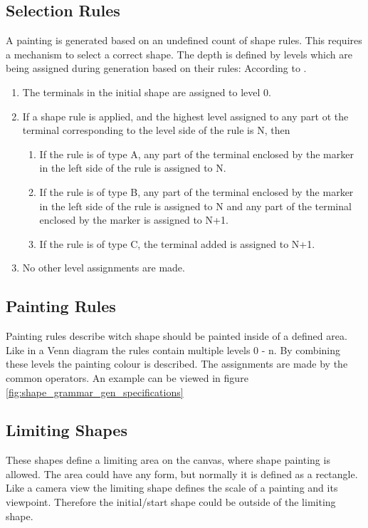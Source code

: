 \subsection{Selection Rules}
\label{sec:Shape_Grammar_Selection_Rules}
A painting is generated based on an undefined count of shape rules. This requires a mechanism to select a correct shape. The depth is defined by levels which are being assigned during generation based on their rules: According to \citep{shapeGrammars:1972}.
\begin{displayquote}
    \begin{enumerate}
        \item The terminals in the initial shape are assigned to level 0.
        \item If a shape rule is applied, and the highest level assigned to any part ot the terminal corresponding to the level side of the rule is N, then
        \begin{enumerate}
            \item If the rule is of type A, any part of the terminal enclosed by the marker in the left side of the rule is assigned to N.
            \item If the rule is of type B, any part of the terminal enclosed by the marker in the left side of the rule is assigned to N and any part of the terminal enclosed by the marker is assigned to N+1.
            \item If the rule is of type C, the terminal added is assigned to N+1.
        \end{enumerate}
        \item No other level assignments are made.
    \end{enumerate}
\end{displayquote}

\subsection{Painting Rules}
\label{sec:Shape_Grammar_Painting_Rules}
Painting rules describe witch shape should be painted inside of a defined area. Like in a Venn diagram the rules contain multiple levels 0 - n. By combining these levels the painting colour is described\citep{shapeGrammars:1972}. The assignments are made by the common operators. An example can be viewed in figure \ref{fig:shape_grammar_gen_specifications}

\subsection{Limiting Shapes}
\label{sec:Shape_Grammar_Limiting_Shapes}
These shapes define a limiting area on the canvas, where shape painting is allowed. 
The area could have any form, but normally it is defined as a rectangle. Like a camera view the limiting shape defines the scale of a painting and its viewpoint. Therefore the initial/start shape could be outside of the limiting shape.

